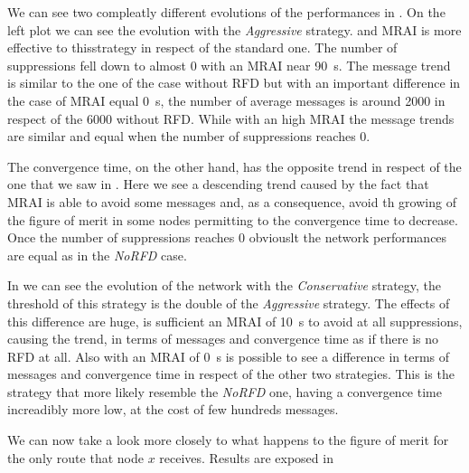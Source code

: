 We can see two compleatly different evolutions of the performances in .
On the left plot we can see the evolution with the \textit{Aggressive} strategy.
and \ac{MRAI} is more effective to thisstrategy in respect of the standard one.
The number of suppressions fell down to almost \num{0} with an \ac{MRAI} near 
\SI{90}{\second}.
The message trend is similar to the one of the case without \ac{RFD} but with an
important difference in the case of  \ac{MRAI} equal \SI{0}{\second}, the number
of average messages is around \num{2000} in respect of the \num{6000} without
\ac{RFD}.
While with an high \ac{MRAI} the message trends are similar and equal when the number of
suppressions reaches \num{0}.

The convergence time, on the other hand, has the opposite trend in respect of 
the one that we saw in .
Here we see a descending trend caused by the fact that \ac{MRAI} is able to avoid
some messages and, as a consequence, avoid th growing of the figure of merit in 
some nodes permitting to the convergence time to decrease.
Once the number of suppressions reaches \num{0} obviouslt the network performances
are equal as in the \textit{NoRFD} case.

In  we can see the evolution of the network with the 
\textit{Conservative} strategy, the threshold of this strategy is the double of
the \textit{Aggressive} strategy.
The effects of this difference are huge, is sufficient an \ac{MRAI} of \SI{10}{\second}
to avoid at all suppressions, causing the trend, in terms of messages and
convergence time as if there is no \ac{RFD} at all.
Also with an \ac{MRAI} of \SI{0}{\second} is possible to see a difference in 
terms of messages and convergence time in respect of the other two strategies.
This is the strategy that more likely resemble the \textit{NoRFD} one,
having a convergence time increadibly more low, at the cost of few hundreds messages.

We can now take a look more closely to what happens to the figure of merit 
for the only route that node $x$ receives.
Results are exposed in 

